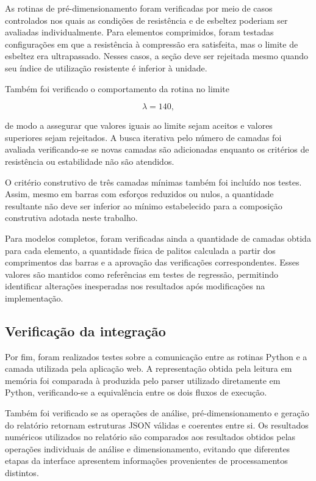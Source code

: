 As rotinas de pré-dimensionamento foram verificadas por meio de casos controlados nos quais as condições de resistência e de esbeltez poderiam ser avaliadas individualmente. Para elementos comprimidos, foram testadas configurações em que a resistência à compressão era satisfeita, mas o limite de esbeltez era ultrapassado. Nesses casos, a seção deve ser rejeitada mesmo quando seu índice de utilização resistente é inferior à unidade.

Também foi verificado o comportamento da rotina no limite

\begin{equation}
    \lambda = 140,
\end{equation}

de modo a assegurar que valores iguais ao limite sejam aceitos e valores superiores sejam rejeitados. A busca iterativa pelo número de camadas foi avaliada verificando-se se novas camadas são adicionadas enquanto os critérios de resistência ou estabilidade não são atendidos.

O critério construtivo de três camadas mínimas também foi incluído nos testes. Assim, mesmo em barras com esforços reduzidos ou nulos, a quantidade resultante não deve ser inferior ao mínimo estabelecido para a composição construtiva adotada neste trabalho.

Para modelos completos, foram verificadas ainda a quantidade de camadas obtida para cada elemento, a quantidade física de palitos calculada a partir dos comprimentos das barras e a aprovação das verificações correspondentes. Esses valores são mantidos como referências em testes de regressão, permitindo identificar alterações inesperadas nos resultados após modificações na implementação.

\subsection{Verificação da integração}
\label{subsec:verificacao-integracao}

Por fim, foram realizados testes sobre a comunicação entre as rotinas Python e a camada utilizada pela aplicação web. A representação obtida pela leitura em memória foi comparada à produzida pelo parser utilizado diretamente em Python, verificando-se a equivalência entre os dois fluxos de execução.

Também foi verificado se as operações de análise, pré-dimensionamento e geração do relatório retornam estruturas \gls{JSON} válidas e coerentes entre si. Os resultados numéricos utilizados no relatório são comparados aos resultados obtidos pelas operações individuais de análise e dimensionamento, evitando que diferentes etapas da interface apresentem informações provenientes de processamentos distintos.

